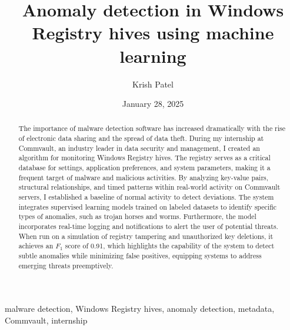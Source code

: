 ﻿\documentclass[12pt,conference,onecolumn]{IEEEtran}
\title{Anomaly detection in Windows Registry hives using machine learning}
\author{Krish Patel}
\date{January 28, 2025}
\newcommand{\keywords}{malware detection, Windows Registry hives, anomaly detection, metadata, Commvault, internship}
\begin{document}
\maketitle 

\begin{abstract}
The importance of malware detection software has increased dramatically with the rise of electronic data sharing and the spread of data theft. During my internship at Commvault, an industry leader in data security and management, I created an algorithm for monitoring Windows Registry hives. The registry serves as a critical database for settings, application preferences, and system parameters, making it a frequent target of malware and malicious activities. By analyzing key-value pairs, structural relationships, and timed patterns within real-world activity on Commvault servers, I established a baseline of normal activity to detect deviations. The system integrates supervised learning models trained on labeled datasets to identify specific types of anomalies, such as trojan horses and worms. Furthermore, the model incorporates real-time logging and notifications to alert the user of potential threats. When run on a simulation of registry tampering and unauthorized key deletions, it achieves an $F_1$ score of 0.91, which highlights the capability of the system to detect subtle anomalies while minimizing false positives, equipping systems to address emerging threats preemptively.
\end{abstract}

\begin{IEEEkeywords}
\keywords
\end{IEEEkeywords}
\end{document}
